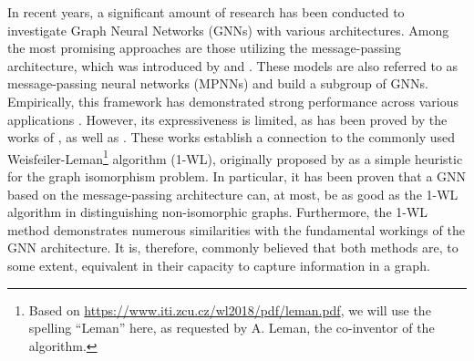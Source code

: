 In recent years, a significant amount of research has been conducted to investigate Graph Neural Networks (GNNs) with various architectures. Among the most promising approaches are those utilizing the message-passing architecture, which was introduced by \cite{Gil+2017} and \cite{Sca+2009}. These models are also referred to as message-passing neural networks (MPNNs) and build a subgroup of GNNs. Empirically, this framework has demonstrated strong performance across various applications \cite{Kip+2017, Ham+2017, Xu2018}. However, its expressiveness is limited, as has been proved by the works of \cite{Morris2018}, as well as \cite{Xu2018}. These works establish a connection to the commonly used Weisfeiler-Leman\footnote{Based on \href{https://www.iti.zcu.cz/wl2018/pdf/leman.pdf}{https://www.iti.zcu.cz/wl2018/pdf/leman.pdf}, we will use the spelling ``Leman'' here, as requested by A. Leman, the co-inventor of the algorithm.} algorithm (1-WL), originally proposed by \cite{Wei+1968} as a simple heuristic for the graph isomorphism problem. In particular, it has been proven that a GNN based on the message-passing architecture can, at most, be as good as the 1-WL algorithm in distinguishing non-isomorphic graphs. Furthermore, the 1-WL method demonstrates numerous similarities with the fundamental workings of the GNN architecture. It is, therefore, commonly believed that both methods are, to some extent, equivalent in their capacity to capture information in a graph.


